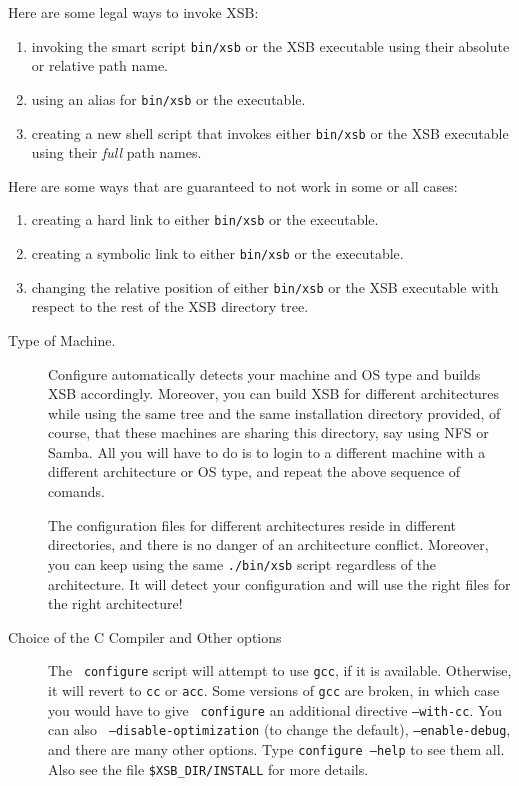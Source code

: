 Here are some legal ways to invoke XSB:
\begin{enumerate}
\item  invoking the smart script \verb|bin/xsb| or the XSB executable using
  their absolute or relative path name.
\item using an alias for \verb|bin/xsb| or the executable.
\item creating a new shell script that invokes either \verb|bin/xsb| or the
  XSB executable using their {\em full\/} path names. 
\end{enumerate}

Here are some ways that are guaranteed to not work in some or all cases:
\begin{enumerate}
\item  creating a hard link to either \verb|bin/xsb| or the executable.
\item creating a symbolic link to either \verb|bin/xsb| or the
  executable.
\item changing the relative position of either \verb|bin/xsb| or the
  XSB executable with respect to the rest of the XSB directory tree.
\end{enumerate}

\begin{description}
\item[Type of Machine.]
  Configure automatically detects your machine and OS type and builds XSB
  accordingly. Moreover, you can build XSB for different architectures
  while using the same tree and the same installation directory provided,
  of course, that these machines are sharing this directory, say using NFS
  or Samba. All you will have to do is to login to a different machine with
  a different architecture or OS type, and repeat the above sequence of
  comands. 
  
  The configuration files for different architectures reside in different
  directories, and there is no danger of an architecture conflict.
  Moreover, you can keep using the same {\tt ./bin/xsb} script regardless
  of the architecture. It will detect your configuration and will use the
  right files for the right architecture! 
  
\item[Choice of the C Compiler and Other options] \label{cc} The {\tt
    configure} script will attempt to use {\tt gcc}, if it is available.
  Otherwise, it will revert to {\tt cc} or {\tt acc}.  Some versions of
  {\tt gcc} are broken, in which case you would have to give {\tt
    configure} an additional directive {\tt --with-cc}.  You can also {\tt
    --disable-optimization} (to change the default), {\tt --enable-debug},
  and there are many other options.  Type {\tt configure --help} to see
  them all. Also see the file \verb'$XSB_DIR/INSTALL' for more details.
\end{description}

